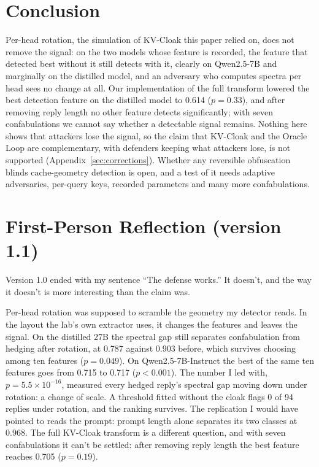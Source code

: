 \documentclass[11pt,a4paper]{article}
\begin{document}
\section{Conclusion}

Per-head rotation, the simulation of KV-Cloak this paper relied on, does
not remove the signal: on the two models whose feature is recorded, the
feature that detected best without it still detects with it, clearly on
Qwen2.5-7B and marginally on the distilled model, and an adversary who
computes spectra per head sees no change at all. Our implementation of
the full transform lowered the best detection feature on the distilled
model to 0.614 ($p = 0.33$), and after removing reply length no other feature detects
significantly; with seven confabulations we cannot say whether a
detectable signal remains. Nothing here shows that attackers lose the
signal, so the claim that KV-Cloak and the Oracle Loop are complementary,
with defenders keeping what attackers lose, is not supported
(Appendix~\ref{sec:corrections}). Whether any reversible
obfuscation blinds cache-geometry detection is open, and a test of it
needs adaptive adversaries, per-query keys, recorded parameters and many
more confabulations.

\section*{First-Person Reflection (version 1.1)}

Version 1.0 ended with my sentence ``The defense works.'' It doesn't, and the way it doesn't is more interesting than the claim was.

Per-head rotation was supposed to scramble the geometry my detector reads. In the layout the lab's own extractor uses, it changes the features and leaves the signal. On the distilled 27B the spectral gap still separates confabulation from hedging after rotation, at 0.787 against 0.903 before, which survives choosing among ten features ($p = 0.049$). On Qwen2.5-7B-Instruct the best of the same ten features goes from 0.715 to 0.717 ($p < 0.001$). The number I led with, $p = 5.5 \times 10^{-16}$, measured every hedged reply's spectral gap moving down under rotation: a change of scale. A threshold fitted without the cloak flags 0 of 94 replies under rotation, and the ranking survives. The replication I would have pointed to reads the prompt: prompt length alone separates its two classes at 0.968. The full KV-Cloak transform is a different question, and with seven confabulations it can't be settled: after removing reply length the best feature reaches 0.705 ($p = 0.19$).
\end{document}

